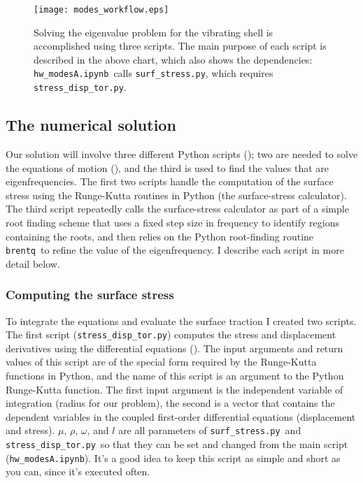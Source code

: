 \documentclass[11pt,titlepage,fleqn]{article}
\newcommand{\tfileA}{{\tt hw\_modesA.ipynb}}
\newcommand{\tfileB}{{\tt surf\_stress.py}}
\newcommand{\tfileC}{{\tt stress\_disp\_tor.py}}
\newcommand{\rfind}{{\tt brentq}}
\begin{document}

\begin{figure}[h]
\centering
\texttt{[image: modes\_workflow.eps]}
\caption[]
{{
Solving the eigenvalue problem for the vibrating shell is accomplished using three scripts. The main purpose of each script is described in the above chart, which also shows the dependencies: \tfileA\ calls \tfileB, which requires \tfileC.
\label{fig:workflow}
}}
\end{figure}


\pagebreak
\subsection{The numerical solution}

Our solution will involve three different Python scripts (); two are needed to solve the equations of motion (), and the third is used to find the values that are eigenfrequencies. The first two scripts handle the computation of the surface stress using the Runge-Kutta routines in Python (the surface-stress calculator). The third script repeatedly calls the surface-stress calculator as part of a simple root finding scheme that uses a fixed step size in frequency to identify regions containing the roots, and then relies on the Python root-finding routine \rfind\ to refine the value of the eigenfrequency. I describe each script in more detail below.

\subsubsection{Computing the surface stress}

To integrate the equations and evaluate the surface traction I created two scripts. The first script (\tfileC) computes the stress and displacement derivatives using the differential equations (). The input arguments and return values of this script are of the special form required by the Runge-Kutta functions in Python, and the name of this script is an argument to the Python Runge-Kutta function. The first input argument is the independent variable of integration (radius for our problem), the second is a vector that contains the dependent variables in the coupled first-order differential equations (displacement and stress). $\mu$, $\rho$, $\omega$, and $l$ are all parameters of \tfileB\ and \tfileC\ so that they can be set and changed from the main script (\tfileA). It's a good idea to keep this script as simple and short as you can, since it's executed often.
\end{document}

